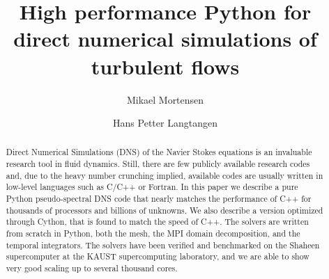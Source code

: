 \documentclass[final,1p,times]{elsarticle}
\begin{document}
\begin{frontmatter}



\title{High performance Python for direct numerical simulations of turbulent flows}


\author[a,b]{Mikael Mortensen}
\address[a]{University of Oslo, Moltke Moes vei 35, 0851 Oslo, Norway}
\address[b]{Center for Biomedical Computing at Simula Research Laboratory, P.O.Box 134, N-1325 Lysaker, Norway}
\author[a,b]{Hans Petter Langtangen}


\newcommand{\hpl}[1]{({\bf hpl comment:} \emph{#1})}






\begin{abstract}
Direct Numerical Simulations (DNS) of the Navier Stokes equations is an
invaluable research tool in fluid dynamics. Still, there are few publicly
available research codes and, due to the heavy number crunching implied,
available codes are usually written in low-level
languages such as C/C++ or Fortran.
In this paper we describe a pure Python pseudo-spectral DNS code
that nearly matches the performance of C++ for thousands of processors
and billions of unknowns. We also describe a version optimized through Cython, that is found to match the speed of C++. The solvers are written from scratch in Python, both the mesh, the MPI domain decomposition, and the temporal integrators. The solvers
have been verified and benchmarked on the Shaheen supercomputer at the
KAUST supercomputing laboratory,
and we are able to show very good scaling up to several thousand cores.


\end{abstract}
\end{frontmatter}
\end{document}
